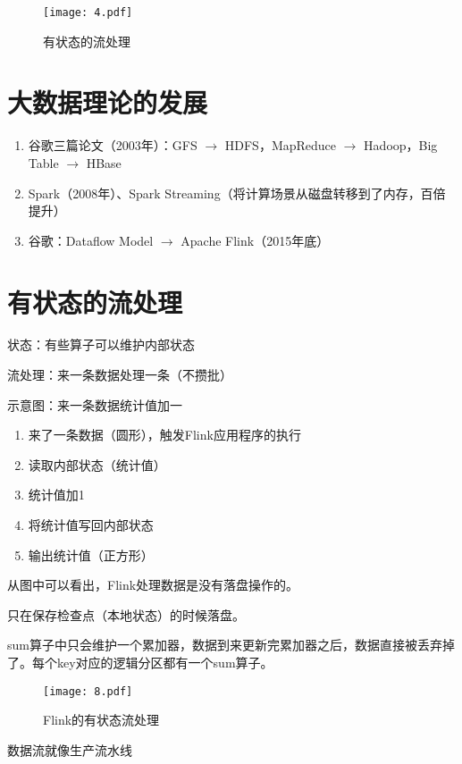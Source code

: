 \documentclass[cn,11pt,chinese]{elegantbook}
\begin{document}
\begin{figure}[htbp]
  \centering
  \texttt{[image: 4.pdf]}
  \caption{有状态的流处理}
\end{figure}

\section{大数据理论的发展}

\begin{enumerate}
  \item 谷歌三篇论文（2003年）：GFS $\rightarrow$ HDFS，MapReduce $\rightarrow$ Hadoop，Big Table $\rightarrow$ HBase
  \item Spark（2008年）、Spark Streaming（将计算场景从磁盘转移到了内存，百倍提升）
  \item 谷歌：Dataflow Model $\rightarrow$ Apache Flink（2015年底）
\end{enumerate}

\section{有状态的流处理}

状态：有些算子可以维护内部状态

流处理：来一条数据处理一条（不攒批）

示意图：来一条数据统计值加一

\begin{enumerate}
  \item 来了一条数据（圆形），触发Flink应用程序的执行
  \item 读取内部状态（统计值）
  \item 统计值加1
  \item 将统计值写回内部状态
  \item 输出统计值（正方形）
\end{enumerate}

从图中可以看出，Flink处理数据是没有落盘操作的。

只在保存检查点（本地状态）的时候落盘。

sum算子中只会维护一个累加器，数据到来更新完累加器之后，数据直接被丢弃掉了。每个key对应的逻辑分区都有一个sum算子。

\begin{figure}[htbp]
  \centering
  \texttt{[image: 8.pdf]}
  \caption{Flink的有状态流处理}
\end{figure}

数据流就像生产流水线
\end{document}
